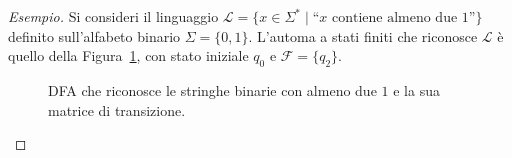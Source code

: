 \documentclass[a4paper, 11pt, oneside]{book}
\theoremstyle{formale}
\newenvironment{esempio}
    {\begin{proof}[\textit{Esempio}]\renewcommand{\qedsymbol}{$\diamond$}}
    {\end{proof}}
\begin{document}
    \begin{esempio}
        Si consideri il linguaggio
        $\mathcal{L} = \{x \in \Sigma^* \mid \text{``$x$ contiene almeno due $1$''}\}$
        definito sull'alfabeto binario $\Sigma = \{0, 1\}$. L'automa a stati finiti che
        riconosce $\mathcal{L}$ \`e quello della Figura~\ref{fig:dfa-due-uno}, con stato
        iniziale $q_0$ e $\mathcal{F} = \{q_2\}$.

        \begin{figure}[H]
            \centering
            \caption{DFA che riconosce le stringhe binarie con almeno due $1$ e la sua
                matrice di transizione.}
            \label{fig:dfa-due-uno}
        \end{figure}


\end{esempio}
\end{document}
